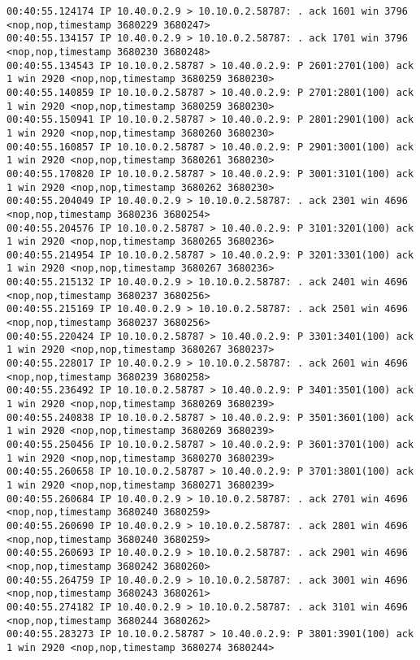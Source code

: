 \documentclass[a4paper,12pt]{article}
\begin{document}
\begin{Verbatim}
00:40:55.124174 IP 10.40.0.2.9 > 10.10.0.2.58787: . ack 1601 win 3796 <nop,nop,timestamp 3680229 3680247>
00:40:55.134157 IP 10.40.0.2.9 > 10.10.0.2.58787: . ack 1701 win 3796 <nop,nop,timestamp 3680230 3680248>
00:40:55.134543 IP 10.10.0.2.58787 > 10.40.0.2.9: P 2601:2701(100) ack 1 win 2920 <nop,nop,timestamp 3680259 3680230>
00:40:55.140859 IP 10.10.0.2.58787 > 10.40.0.2.9: P 2701:2801(100) ack 1 win 2920 <nop,nop,timestamp 3680259 3680230>
00:40:55.150941 IP 10.10.0.2.58787 > 10.40.0.2.9: P 2801:2901(100) ack 1 win 2920 <nop,nop,timestamp 3680260 3680230>
00:40:55.160857 IP 10.10.0.2.58787 > 10.40.0.2.9: P 2901:3001(100) ack 1 win 2920 <nop,nop,timestamp 3680261 3680230>
00:40:55.170820 IP 10.10.0.2.58787 > 10.40.0.2.9: P 3001:3101(100) ack 1 win 2920 <nop,nop,timestamp 3680262 3680230>
00:40:55.204049 IP 10.40.0.2.9 > 10.10.0.2.58787: . ack 2301 win 4696 <nop,nop,timestamp 3680236 3680254>
00:40:55.204576 IP 10.10.0.2.58787 > 10.40.0.2.9: P 3101:3201(100) ack 1 win 2920 <nop,nop,timestamp 3680265 3680236>
00:40:55.214954 IP 10.10.0.2.58787 > 10.40.0.2.9: P 3201:3301(100) ack 1 win 2920 <nop,nop,timestamp 3680267 3680236>
00:40:55.215132 IP 10.40.0.2.9 > 10.10.0.2.58787: . ack 2401 win 4696 <nop,nop,timestamp 3680237 3680256>
00:40:55.215169 IP 10.40.0.2.9 > 10.10.0.2.58787: . ack 2501 win 4696 <nop,nop,timestamp 3680237 3680256>
00:40:55.220424 IP 10.10.0.2.58787 > 10.40.0.2.9: P 3301:3401(100) ack 1 win 2920 <nop,nop,timestamp 3680267 3680237>
00:40:55.228017 IP 10.40.0.2.9 > 10.10.0.2.58787: . ack 2601 win 4696 <nop,nop,timestamp 3680239 3680258>
00:40:55.236492 IP 10.10.0.2.58787 > 10.40.0.2.9: P 3401:3501(100) ack 1 win 2920 <nop,nop,timestamp 3680269 3680239>
00:40:55.240838 IP 10.10.0.2.58787 > 10.40.0.2.9: P 3501:3601(100) ack 1 win 2920 <nop,nop,timestamp 3680269 3680239>
00:40:55.250456 IP 10.10.0.2.58787 > 10.40.0.2.9: P 3601:3701(100) ack 1 win 2920 <nop,nop,timestamp 3680270 3680239>
00:40:55.260658 IP 10.10.0.2.58787 > 10.40.0.2.9: P 3701:3801(100) ack 1 win 2920 <nop,nop,timestamp 3680271 3680239>
00:40:55.260684 IP 10.40.0.2.9 > 10.10.0.2.58787: . ack 2701 win 4696 <nop,nop,timestamp 3680240 3680259>
00:40:55.260690 IP 10.40.0.2.9 > 10.10.0.2.58787: . ack 2801 win 4696 <nop,nop,timestamp 3680240 3680259>
00:40:55.260693 IP 10.40.0.2.9 > 10.10.0.2.58787: . ack 2901 win 4696 <nop,nop,timestamp 3680242 3680260>
00:40:55.264759 IP 10.40.0.2.9 > 10.10.0.2.58787: . ack 3001 win 4696 <nop,nop,timestamp 3680243 3680261>
00:40:55.274182 IP 10.40.0.2.9 > 10.10.0.2.58787: . ack 3101 win 4696 <nop,nop,timestamp 3680244 3680262>
00:40:55.283273 IP 10.10.0.2.58787 > 10.40.0.2.9: P 3801:3901(100) ack 1 win 2920 <nop,nop,timestamp 3680274 3680244>

\end{Verbatim}
\end{document}
